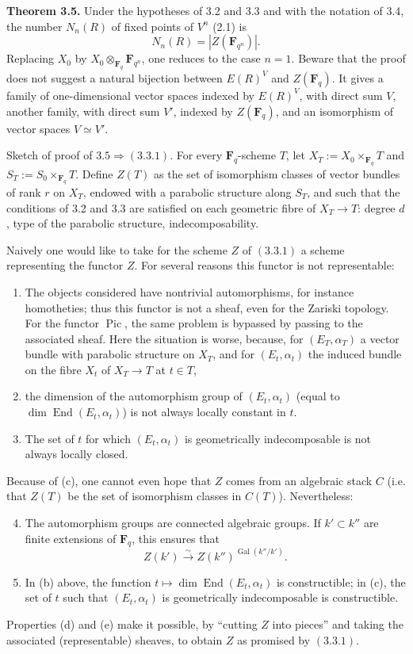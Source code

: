 \documentclass[11pt]{article}
\newcommand{\Fq}{\mathbf F_q}
\newcommand{\End}{\operatorname{End}}
\newcommand{\Gal}{\operatorname{Gal}}
\newcommand{\Pic}{\operatorname{Pic}}
\begin{document}
\textbf{Theorem 3.5.} Under the hypotheses of 3.2 and 3.3 and with the notation of 3.4, the number \(N_n(R)\) of fixed points of \(V^n\) (2.1) is
\begin{equation}\tag{3.5.1}
N_n(R)=|Z(\mathbf F_{q^n})|.
\end{equation}
Replacing \(X_0\) by \(X_0\otimes_{\Fq}\mathbf F_{q^n}\), one reduces to the case \(n=1\). Beware that the proof does not suggest a natural bijection between \(E(R)^V\) and \(Z(\Fq)\). It gives a family of one-dimensional vector spaces indexed by \(E(R)^V\), with direct sum \(V\), another family, with direct sum \(V'\), indexed by \(Z(\Fq)\), and an isomorphism of vector spaces \(V\simeq V'\).

Sketch of proof of \(3.5\Rightarrow(3.3.1)\). For every \(\Fq\)-scheme \(T\), let \(X_T:=X_0\times_{\Fq}T\) and \(S_T:=S_0\times_{\Fq}T\). Define \(Z(T)\) as the set of isomorphism classes of vector bundles of rank \(r\) on \(X_T\), endowed with a parabolic structure along \(S_T\), and such that the conditions of 3.2 and 3.3 are satisfied on each geometric fibre of \(X_T\to T\): degree \(d\), type of the parabolic structure, indecomposability.

Naively one would like to take for the scheme \(Z\) of \((3.3.1)\) a scheme representing the functor \(Z\). For several reasons this functor is not representable:
\begin{enumerate}[label=(\alph*)]
\item The objects considered have nontrivial automorphisms, for instance homotheties; thus this functor is not a sheaf, even for the Zariski topology. For the functor \(\Pic\), the same problem is bypassed by passing to the associated sheaf. Here the situation is worse, because, for \((E_T,\alpha_T)\) a vector bundle with parabolic structure on \(X_T\), and for \((E_t,\alpha_t)\) the induced bundle on the fibre \(X_t\) of \(X_T\to T\) at \(t\in T\),
\item the dimension of the automorphism group of \((E_t,\alpha_t)\) (equal to \(\dim\End(E_t,\alpha_t)\)) is not always locally constant in \(t\).
\item The set of \(t\) for which \((E_t,\alpha_t)\) is geometrically indecomposable is not always locally closed.
\end{enumerate}
Because of (c), one cannot even hope that \(Z\) comes from an algebraic stack \(C\) (i.e. that \(Z(T)\) be the set of isomorphism classes in \(C(T)\)). Nevertheless:
\begin{enumerate}[label=(\alph*)]
\setcounter{enumi}{3}
\item The automorphism groups are connected algebraic groups. If \(k'\subset k''\) are finite extensions of \(\Fq\), this ensures that
\[
Z(k')\xrightarrow{\sim}Z(k'')^{\Gal(k''/k')}.
\]
\item In (b) above, the function \(t\mapsto\dim\End(E_t,\alpha_t)\) is constructible; in (c), the set of \(t\) such that \((E_t,\alpha_t)\) is geometrically indecomposable is constructible.
\end{enumerate}
Properties (d) and (e) make it possible, by ``cutting \(Z\) into pieces'' and taking the associated (representable) sheaves, to obtain \(Z\) as promised by \((3.3.1)\).
\end{document}
